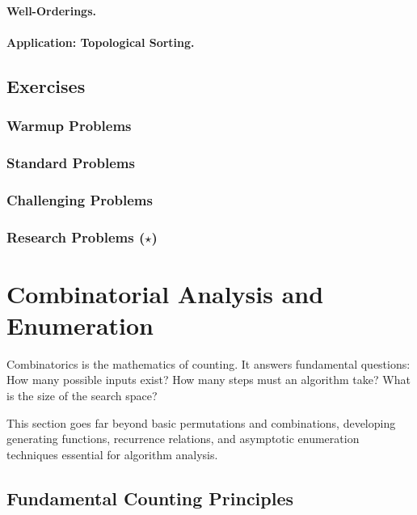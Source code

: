 \paragraph{Well-Orderings.}
\paragraph{Application: Topological Sorting.}

\subsection{Exercises}
\subsubsection{Warmup Problems}
\subsubsection{Standard Problems}
\subsubsection{Challenging Problems}
\subsubsection{Research Problems ($\star$)}

\section{Combinatorial Analysis and Enumeration}
\label{sec:combinatorics}

\begin{sectionintro}
Combinatorics is the mathematics of counting. It answers fundamental questions: 
How many possible inputs exist? How many steps must an algorithm take? What is 
the size of the search space?

This section goes far beyond basic permutations and combinations, developing 
generating functions, recurrence relations, and asymptotic enumeration 
techniques essential for algorithm analysis.
\end{sectionintro}

\subsection{Fundamental Counting Principles}
\label{subsec:counting-principles}

